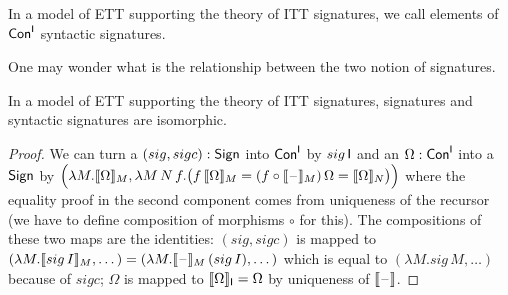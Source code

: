 \documentclass[a4paper,UKenglish,cleveref, autoref]{lipics-v2019}
\begin{document}
\begin{definition}\label{def:syntacticsignature}
  In a model of ETT supporting the theory of ITT signatures, we call
  elements of $\mathsf{Con}^{\mathsf{I}}$ syntactic signatures.
\end{definition}

One may wonder what is the relationship between the two notion of
signatures.
\begin{lemma}
  In a model of ETT supporting the theory of ITT signatures,
  signatures and syntactic signatures are isomorphic.
\end{lemma}
\begin{proof}
  We can turn a $({sig},{sigc}) : \mathsf{Sign}$ into $\mathsf{Con}^{\mathsf{I}}$ by ${sig}\,\mathsf{I}$
  and an $\Omega:\mathsf{Con}^{\mathsf{I}}$ into a $\mathsf{Sign}$ by
  $\Big(\lambda M.\llbracket\Omega\rrbracket_M, \lambda M\,N\,f.\big(f\,\llbracket\Omega\rrbracket_M =
  (f\circ\llbracket\mathord{\hspace{1pt}\text{--}\hspace{1pt}}\rrbracket_M)\,\Omega = \llbracket\Omega\rrbracket_N\big)\Big)$ where the equality
  proof in the second component comes from uniqueness of the recursor
  (we have to define composition of morphisms $\circ$ for this). The
  compositions of these two maps are the identities: $({sig},{sigc})$
  is mapped to
  $(\lambda M.\llbracket{sig}\,I\rrbracket_M,\dots) = (\lambda
  M.\llbracket\mathord{\hspace{1pt}\text{--}\hspace{1pt}}\rrbracket_M\,({sig}\,I),\dots)$ which is equal to
  $(\lambda M.{sig}\,M,\dots)$ because of ${sigc}$; $\Omega$ is mapped
  to $\llbracket\Omega\rrbracket_{\mathsf{I}} = \Omega$ by uniqueness of $\llbracket\mathord{\hspace{1pt}\text{--}\hspace{1pt}}\rrbracket$.
\end{proof}
\end{document}

